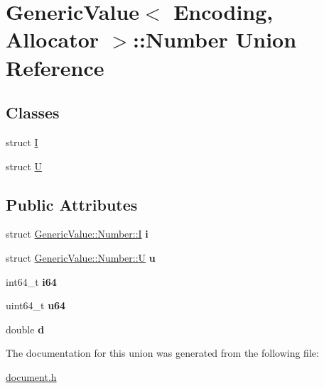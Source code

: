 \hypertarget{a00226}{}\section{Generic\+Value$<$ Encoding, Allocator $>$\+:\+:Number Union Reference}
\label{a00226}
\subsection*{Classes}
\begin{DoxyCompactItemize}
\item 
struct \hyperlink{a00141}{I}
\item 
struct \hyperlink{a00324}{U}
\end{DoxyCompactItemize}
\subsection*{Public Attributes}
\begin{DoxyCompactItemize}
\item 
struct \hyperlink{a00141}{Generic\+Value\+::\+Number\+::I} {\bfseries i}\hypertarget{a00226_a0593fffc72a240979606668179e94436}{}\label{a00226_a0593fffc72a240979606668179e94436}

\item 
struct \hyperlink{a00324}{Generic\+Value\+::\+Number\+::U} {\bfseries u}\hypertarget{a00226_a3b5f0986718c830b88d641491248131d}{}\label{a00226_a3b5f0986718c830b88d641491248131d}

\item 
int64\+\_\+t {\bfseries i64}\hypertarget{a00226_ae53d96a8ead92099541da3b71633b77b}{}\label{a00226_ae53d96a8ead92099541da3b71633b77b}

\item 
uint64\+\_\+t {\bfseries u64}\hypertarget{a00226_a1c8d3c6d226cf74315e233b30b622430}{}\label{a00226_a1c8d3c6d226cf74315e233b30b622430}

\item 
double {\bfseries d}\hypertarget{a00226_a7ca3ad492fff303586d241eb0d17c242}{}\label{a00226_a7ca3ad492fff303586d241eb0d17c242}

\end{DoxyCompactItemize}


The documentation for this union was generated from the following file\+:\begin{DoxyCompactItemize}
\item 
\hyperlink{a00473}{document.\+h}\end{DoxyCompactItemize}
